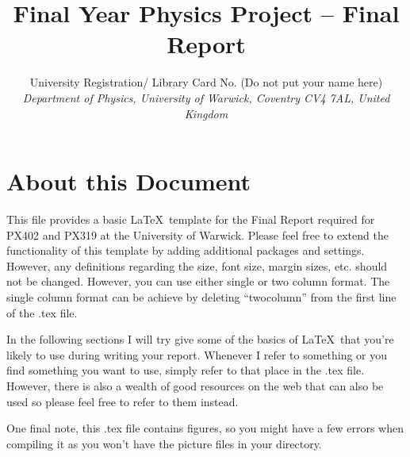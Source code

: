 \documentclass[a4paper,twocolumn,12pt, notitlepage]{article}
\begin{document}
\title{\textbf{\large{Final Year Physics Project – Final Report}}}

\author{\normalsize{University Registration/ Library Card No. (Do not put your name here)} \\
        \small\textit{
        Department of Physics, University of Warwick,
        Coventry CV4 7AL, United Kingdom}}
\date{}


\section{About this Document}
This file provides a basic \LaTeX\ template for the Final Report required for PX402 and PX319 at the University of Warwick. Please feel free to extend the functionality of this template by adding additional packages and settings. However, any definitions regarding the size, font size, margin sizes, etc. should not be changed. However, you can use either single or two column format. The single column format can be achieve by deleting ``twocolumn'' from the first line of the .tex file.

In the following sections I will try give some of the basics of \LaTeX\ that you're likely to use during writing your report. Whenever I refer to something or you find something you want to use, simply refer to that place in the .tex file. However, there is also a wealth of good resources on the web that can also be used so please feel free to refer to them instead.

One final note, this .tex file contains figures, so you might have a few errors when compiling it as you won't have the  picture files in your directory.  
\end{document}
